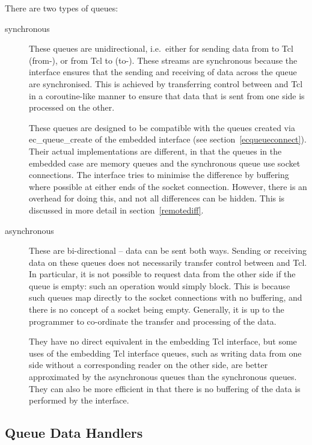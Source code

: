 There are two types of queues: 

\begin{description}
\item[synchronous] These queues are unidirectional,
i.e.\ either for sending data from {\eclipse} to Tcl (from-{\eclipse}), or
from Tcl to {\eclipse} (to-{\eclipse}). 
These streams are synchronous because the interface ensures that the
sending and receiving of data across the queue are synchronised. This is
achieved by transferring control between
{\eclipse} and Tcl in a coroutine-like manner to ensure that data that is
sent from one side is processed on the other. 


{\sloppy
These queues are  designed to be compatible with the queues
created via ec_queue_create of the embedded interface 
(see section~\ref{ecqueueconnect}). Their actual implementations are
different, in that the queues in the embedded case are memory queues and
the synchronous queue use socket connections. The interface tries to
minimise the difference by buffering where
possible at either ends of the  socket connection. However, there is an overhead for doing
this, and not all differences can be hidden. This is discussed in more detail in section~\ref{remotediff}.
}


\item[asynchronous] These are bi-directional --
data can be sent both ways. Sending or receiving data on these queues does
not necessarily transfer control between {\eclipse} and
Tcl. In particular, it is not possible to request data from the other side
if the queue is empty: such an operation would simply block. 
This is because such queues map
directly to the socket connections with no buffering, and there is no concept of a socket
being empty. Generally, it is up to the programmer to co-ordinate the
transfer and processing of the data. 

They have no direct
equivalent in the embedding Tcl interface, but some uses of the embedding
Tcl interface queues, such as writing data from one side without a
corresponding reader on the other side, are better approximated by the
asynchronous queues than the synchronous queues.  They can also be more
efficient in that there is no buffering of the data is performed by the
interface. 

\end{description}

\subsection{Queue Data Handlers}
\label{remotehandles}

